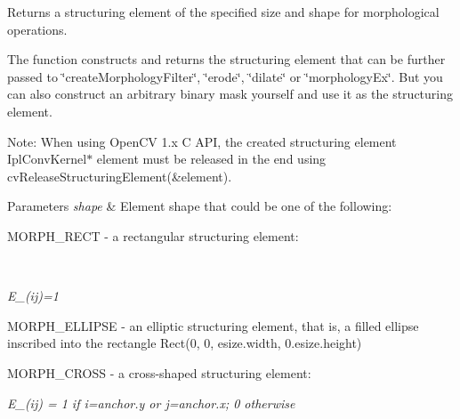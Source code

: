 Returns a structuring element of the specified size and shape for morphological operations.

The function constructs and returns the structuring element that can be further passed to \char`\"{}create\+Morphology\+Filter\char`\"{}, \char`\"{}erode\char`\"{}, \char`\"{}dilate\char`\"{} or \char`\"{}morphology\+Ex\char`\"{}. But you can also construct an arbitrary binary mask yourself and use it as the structuring element.

Note\+: When using Open\+CV 1.\+x C A\+PI, the created structuring element {\ttfamily Ipl\+Conv\+Kernel$\ast$ element} must be released in the end using {\ttfamily cv\+Release\+Structuring\+Element(\&element)}.


\begin{DoxyParams}{Parameters}
{\em shape} & Element shape that could be one of the following\+: 
\begin{DoxyItemize}
\item M\+O\+R\+P\+H\+\_\+\+R\+E\+CT -\/ a rectangular structuring element\+: 
\end{DoxyItemize}\\
\hline
\end{DoxyParams}


{\itshape E\+\_\+(ij)=1}


\begin{DoxyItemize}
\item M\+O\+R\+P\+H\+\_\+\+E\+L\+L\+I\+P\+SE -\/ an elliptic structuring element, that is, a filled ellipse inscribed into the rectangle {\ttfamily Rect(0, 0, esize.\+width, 0.\+esize.\+height)} 
\item M\+O\+R\+P\+H\+\_\+\+C\+R\+O\+SS -\/ a cross-\/shaped structuring element\+: 
\end{DoxyItemize}

{\itshape E\+\_\+(ij) = 1 if i=anchor.\+y or j=anchor.\+x; 0 otherwise}


